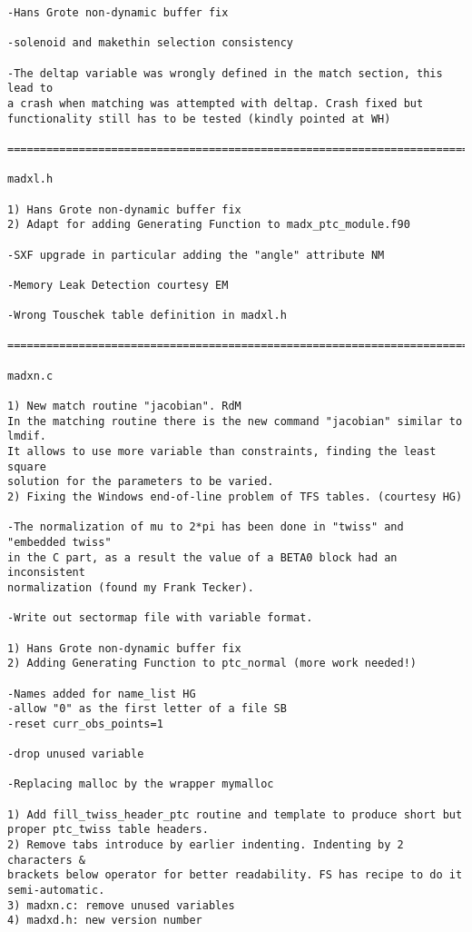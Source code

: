 \begin{verbatim}
-Hans Grote non-dynamic buffer fix

-solenoid and makethin selection consistency

-The deltap variable was wrongly defined in the match section, this lead to
a crash when matching was attempted with deltap. Crash fixed but
functionality still has to be tested (kindly pointed at WH)

=============================================================================

madxl.h

1) Hans Grote non-dynamic buffer fix
2) Adapt for adding Generating Function to madx_ptc_module.f90

-SXF upgrade in particular adding the "angle" attribute NM

-Memory Leak Detection courtesy EM

-Wrong Touschek table definition in madxl.h

=============================================================================

madxn.c

1) New match routine "jacobian". RdM
In the matching routine there is the new command "jacobian" similar to lmdif.
It allows to use more variable than constraints, finding the least square
solution for the parameters to be varied.
2) Fixing the Windows end-of-line problem of TFS tables. (courtesy HG)

-The normalization of mu to 2*pi has been done in "twiss" and "embedded twiss"
in the C part, as a result the value of a BETA0 block had an inconsistent
normalization (found my Frank Tecker).

-Write out sectormap file with variable format.

1) Hans Grote non-dynamic buffer fix
2) Adding Generating Function to ptc_normal (more work needed!)

-Names added for name_list HG
-allow "0" as the first letter of a file SB
-reset curr_obs_points=1

-drop unused variable

-Replacing malloc by the wrapper mymalloc

1) Add fill_twiss_header_ptc routine and template to produce short but
proper ptc_twiss table headers.
2) Remove tabs introduce by earlier indenting. Indenting by 2 characters &
brackets below operator for better readability. FS has recipe to do it
semi-automatic.
3) madxn.c: remove unused variables
4) madxd.h: new version number


\end{verbatim}
